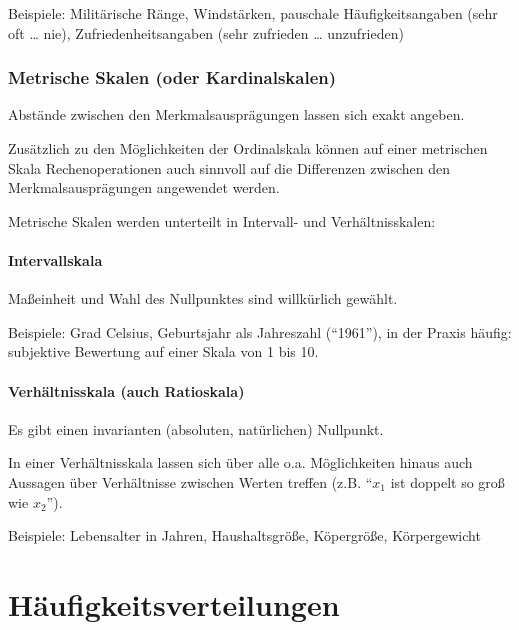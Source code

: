 \documentclass[
  11pt,
  ngerman,
  a4paper,
]{report}
\begin{document}
Beispiele: Militärische Ränge, Windstärken, pauschale Häufigkeitsangaben (sehr oft \ldots{} nie), Zufriedenheitsangaben (sehr zufrieden \ldots{} unzufrieden)

\hypertarget{metrische-skalen-oder-kardinalskalen}{%
\subsubsection{Metrische Skalen (oder Kardinalskalen)}\label{metrische-skalen-oder-kardinalskalen}}

Abstände zwischen den Merkmalsausprägungen lassen sich exakt angeben.

Zusätzlich zu den Möglichkeiten der Ordinalskala können auf einer metrischen Skala Rechenoperationen auch sinnvoll auf die Differenzen zwischen den Merkmalsausprägungen angewendet werden.

Metrische Skalen werden unterteilt in Intervall- und Verhältnisskalen:

\hypertarget{intervallskala}{%
\paragraph{Intervallskala}\label{intervallskala}}

Maßeinheit und Wahl des Nullpunktes sind willkürlich gewählt.

Beispiele: Grad Celsius, Geburtsjahr als Jahreszahl (\enquote{1961}), in der Praxis häufig: subjektive Bewertung auf einer Skala von 1 bis 10.

\hypertarget{verhuxe4ltnisskala-auch-ratioskala}{%
\paragraph{Verhältnisskala (auch Ratioskala)}\label{verhuxe4ltnisskala-auch-ratioskala}}

Es gibt einen invarianten (absoluten, natürlichen) Nullpunkt.

In einer Verhältnisskala lassen sich über alle o.a. Möglichkeiten hinaus auch Aussagen über Verhältnisse zwischen Werten treffen (z.B. \enquote{\(x_1\) ist doppelt so groß wie \(x_2\)}).

Beispiele: Lebensalter in Jahren, Haushaltsgröße, Köpergröße,
Körpergewicht

\hypertarget{huxe4ufigkeitsverteilungen}{%
\section{Häufigkeitsverteilungen}\label{huxe4ufigkeitsverteilungen}}
\end{document}
